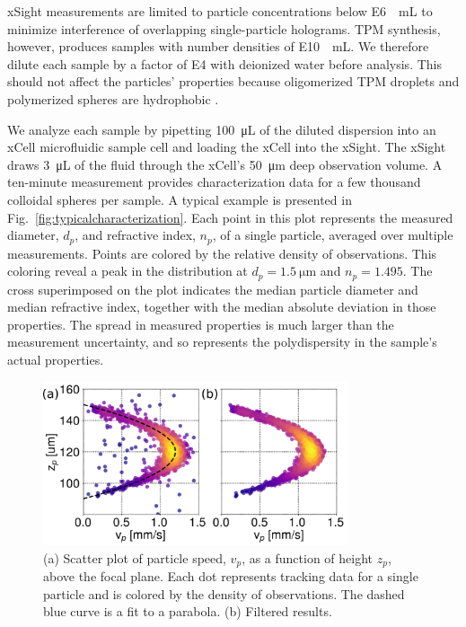 \documentclass[journal=langd5,manuscript=article]{achemso}
\begin{document}
xSight measurements are limited to particle concentrations
below \SI{E6}{\per\milli\liter} to minimize interference
of overlapping single-particle holograms.
TPM synthesis, however,
produces samples with number densities of \SI{E10}{\per\milli\liter}.
We therefore
dilute each sample by a factor of \num{E4}
with deionized water before analysis.
This should not affect the particles'
properties because oligomerized TPM droplets and 
polymerized spheres are hydrophobic \cite{vanderwel17}.

We analyze each sample by pipetting \SI{100}{\micro\liter} of the diluted
dispersion into an xCell microfluidic sample cell and loading the xCell into the xSight.
The xSight draws \SI{3}{\micro\liter} of the fluid through
the xCell's \SI{50}{\um} deep observation volume.
A ten-minute measurement provides
characterization data for a few thousand colloidal spheres per sample.
A typical example is presented in Fig.~\ref{fig:typicalcharacterization}.
Each point in this plot represents the measured diameter, $d_p$,
and refractive index, $n_p$, of a single particle, averaged over
multiple measurements. Points are
colored by the relative density of observations.
This coloring reveal a peak in the distribution at $d_p = \SI{1.5}{\um}$
and $n_p = \num{1.495}$. The cross superimposed on the plot indicates
the median particle diameter and median refractive index, together
with the median absolute deviation in those properties.
The spread in measured properties is much larger than the
measurement uncertainty, and so represents
the polydispersity in the sample's actual properties.

\begin{figure}
  \centering
  \includegraphics[width=0.8\textwidth]{velocity_plots}
  \caption{(a) Scatter plot of particle speed, 
    $v_p$, as a function of
    height $z_p$, above the focal plane.  Each dot represents
    tracking data for a single particle and is colored
    by the density of observations. The dashed blue curve
    is a fit to a parabola.
    (b) Filtered results.}
  \label{fig:flow_prof}
\end{figure}
\end{document}
